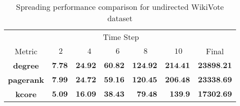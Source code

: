 \documentclass{article}
\begin{document}
 \begin{table}
 \begin{tabular}{crrrrrr}
\hline
 \multicolumn{1}{c}{}&\multicolumn{5}{c}{Time Step}\\ 
Metric & \multicolumn{1}{c}{$~2$}  & \multicolumn{1}{c}{$~~~~4$}  & \multicolumn{1}{c}{$~~~~6$} &  \multicolumn{1}{c}{$~8$}  & \multicolumn{1}{c}{$~10$} & \multicolumn{1}{c}{Final}  \\ 
\midrule
 \textbf{degree}& $\textbf{7.78}$ & $\textbf{24.92}$ & $\textbf{60.82}$ & $\textbf{124.92}$ & $\textbf{214.41}$ & $\textbf{23898.21}$ \\ 
 \midrule
 \textbf{pagerank}& $\textbf{7.99}$ & $\textbf{24.72}$ & $\textbf{59.16}$ & $\textbf{120.45}$ & $\textbf{206.48}$ & $\textbf{23338.69}$ \\ 
 \midrule
 \textbf{kcore}& $\textbf{5.09}$ & $\textbf{16.09}$ & $\textbf{38.43}$ & $\textbf{79.48}$ & $\textbf{139.9}$ & $\textbf{17302.69}$ \\ 
 \midrule
\hline
 \end{tabular}
 \caption{Spreading performance comparison for undirected WikiVote  dataset}
\end{table}
\end{document}
